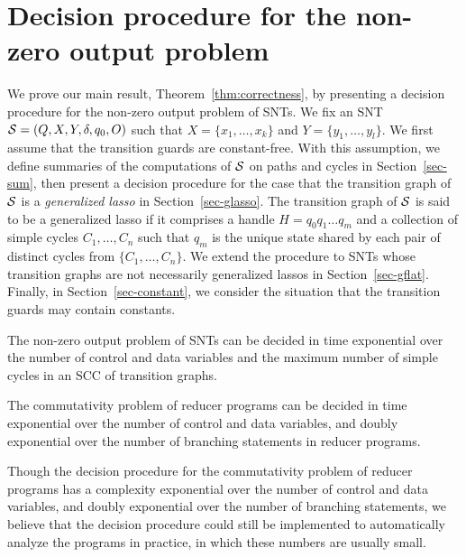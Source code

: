 
\section{Decision procedure for the non-zero output problem}\label{sec:dec-snt}
%
We prove our main result, Theorem~\ref{thm:correctness}, by presenting a decision procedure for the non-zero output problem of SNTs. We fix an SNT ${\mathcal{S} } = (Q,X,Y,\delta,q_0,O)$ such that $X=\{ x_1,\dots, x_k\}$ and $Y = \{y_1,\dots,y_l\}$. 
We first assume that the transition guards are constant-free. With this assumption, we define summaries of the computations of ${\mathcal{S} }$ on paths and cycles in Section~\ref{sec-sum}, then present a decision procedure for the case that the transition graph of ${\mathcal{S} }$ is a \emph{generalized lasso} in Section~\ref{sec-glasso}. The transition graph of ${\mathcal{S} }$ is said to be a generalized lasso if it comprises a handle $H=q_0 q_1 \dots q_m$ and a collection of simple cycles $C_1,\dots,C_n$ such that $q_m$ is the unique state shared by each pair of distinct cycles from $\{C_1,\dots,C_n\}$. We extend the procedure to SNTs whose transition graphs are not necessarily generalized lassos  in Section~\ref{sec-gflat}. Finally,  in Section~\ref{sec-constant}, we consider the situation that the transition guards may contain constants.

\begin{theorem}\label{thm:correctness}
The non-zero output problem of SNTs can be decided in time exponential over the number of control and data variables and the maximum number of simple cycles in an SCC of transition graphs.
\end{theorem}
\vspace{-2mm}

\begin{corollary}\label{cor:snt-dec-proc}
The commutativity problem of  reducer programs can be decided in time exponential over the number of control and data variables, and doubly exponential over the number of branching statements in reducer programs. 
\end{corollary}

\begin{remark}
Though the decision procedure for the commutativity problem of reducer programs has a complexity exponential over the number of control and data variables, and doubly exponential over the number of branching statements, we believe that the decision procedure could still be implemented to automatically analyze the programs in practice, in which these numbers are usually small. 
\end{remark}

